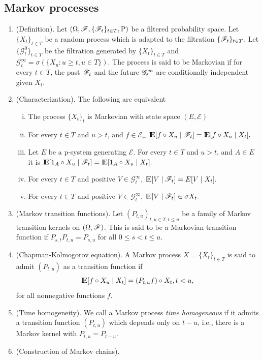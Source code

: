 \documentclass[a4paper,10pt]{article}
\begin{document}
\subsection{Markov processes}
\begin{enumerate}
 \item (Definition). Let $(\Omega, \mathscr{F}, \{\mathscr{F}_t\}_{t\in T}, \mathrm{P})$ be a filtered probability space.
       Let $\{X_t\}_{t\in T}$ be a random process which is adapted to the filtration $\{\mathscr{F}_t\}_{t\in T}$.
       Let $\{\mathcal{G}^0_t\}_{t\in T}$ be the filtration generated by $\{X_t\}_{t\in T}$ and 
       $\mathcal{G}^\infty_t = \sigma(\{X_u: u\geq t, u\in T\})$. The process is said to be
       Markovian if for every $t\in T$, the past $\mathscr{F}_t$ and the future $\mathscr{G}^\infty_t$ are conditionally
       independent given $X_t$.
 \item (Characterization). The following are equivalent
       \begin{enumerate}[i.]
        \item The process $\{X_t\}_t$ is Markovian with state space $(E, \mathcal{E})$
        \item For every $t\in T$ and $u>t$, and $f\in\mathcal{E}_+$
           $
             \E[f\circ X_u\mid \F_t] = \E[f\circ X_u\mid X_t].
           $
        \item Let $E$ be a p-system generating $\mathcal{E}$.
              For every $t\in T$ and $u>t$, and $A\in E$ it is
              $
                \E[1_A\circ X_u\mid \F_t] = \E[1_A\circ X_u\mid X_t].
              $
        \item For every $t\in T$ and positive $V\in \mathcal{G}^\infty_t$,
           $
             \E[V\mid \F_t] = E[V\mid X_t].
           $
        \item For every $t\in T$ and positive $V\in \mathcal{G}^\infty_t$,
           $
             \E[V\mid \F_t] \in \sigma X_t.
           $
       \end{enumerate}
  \item (Markov transition functions). Let $(P_{t,u})_{t,u\in T, t\leq u}$ be a family of Markov transition kernels on $(\Omega, \mathscr{F})$. This is said to be a Markovian transition function if $P_{s,t}P_{t,u} = P_{s,u}$ for all $0\leq s < t \leq u$.
  \item (Chapman-Kolmogorov equation). A Markov process $X=\{X_t\}_{t\in T}$ is said to admit $(P_{t,u})$ as a transition function if 
  \[
   \E[f\circ X_u \mid X_t] = (P_{t,u}f)\circ X_t, t<u,
  \]
  for all nonnegative functions $f$.
  \item (Time homogeneity). We call a Markov process \textit{time homogeneous} if it admits a transition function $(P_{t,u})$ which depends only on $t-u$, i.e., there is a Markov kernel with $P_{t,u}=P_{t-u}$.
  \item (Construction of Markov chains).
\end{enumerate}
\end{document}

